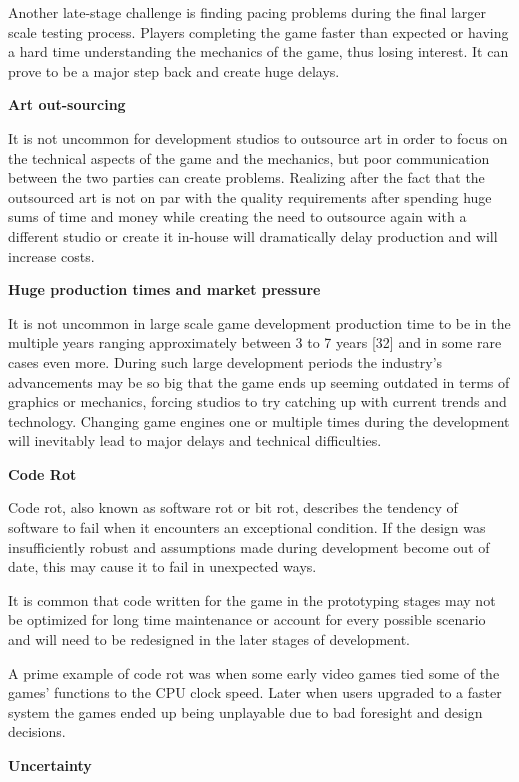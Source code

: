 \documentclass[a4paper,one side,12pt]{book}
\begin{document}
Another late-stage challenge is finding pacing problems during the final
larger scale testing process. Players completing the game faster than
expected or having a hard time understanding the mechanics of the game,
thus losing interest. It can prove to be a major step back and create
huge delays.

\textbf{{Art out-sourcing}}

It is not uncommon for development studios to outsource art in order to
focus on the technical aspects of the game and the mechanics, but poor
communication between the two parties can create problems. Realizing
after the fact that the outsourced art is not on par with the quality
requirements after spending huge sums of time and money while creating
the need to outsource again with a different studio or create it
in-house will dramatically delay production and will increase costs.

\textbf{{Huge production times and market pressure}}

It is not uncommon in large scale game development production time to be
in the multiple years ranging approximately between 3 to 7 years
{[}32{]} and in some rare cases even more. During such large development
periods the industry's advancements may be so big that the game ends up
seeming outdated in terms of graphics or mechanics, forcing studios to
try catching up with current trends and technology. Changing game
engines one or multiple times during the development will inevitably
lead to major delays and technical difficulties.

\textbf{{Code Rot}}

Code rot, also known as software rot or bit rot, describes the tendency
of software to fail when it encounters an exceptional condition. If the
design was insufficiently robust and assumptions made during development
become out of date, this may cause it to fail in unexpected ways.

It is common that code written for the game in the prototyping stages
may not be optimized for long time maintenance or account for every
possible scenario and will need to be redesigned in the later stages of
development.

A prime example of code rot was when some early video games tied some of
the games' functions to the CPU clock speed. Later when users upgraded
to a faster system the games ended up being unplayable due to bad
foresight and design decisions.\cite{salemi_1992_slowing}

\textbf{{Uncertainty}}
\end{document}
